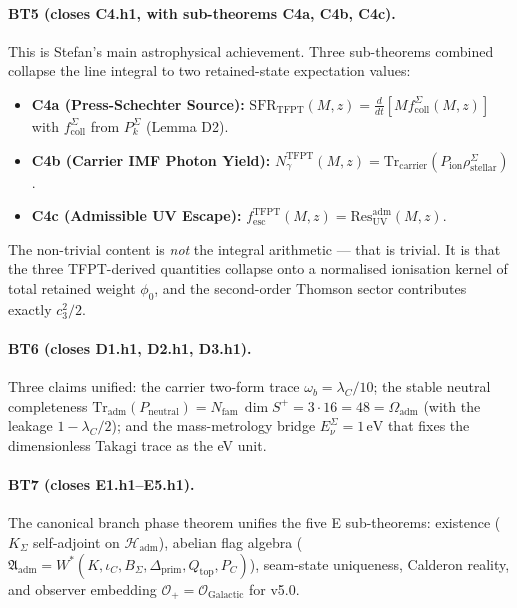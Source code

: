 \paragraph{BT5 (closes C4.h1, with sub-theorems C4a, C4b, C4c).}
This is Stefan's main astrophysical achievement.  Three sub-theorems
combined collapse the line integral to two retained-state expectation
values:
\begin{itemize}[leftmargin=1.4em]
\item \textbf{C4a (Press-Schechter Source):}
\(\mathrm{SFR}_{\mathrm{TFPT}}(M,z)=
\frac{d}{dt}[M f_{\mathrm{coll}}^\Sigma(M,z)]\) with
\(f_{\mathrm{coll}}^\Sigma\) from \(P_k^\Sigma\) (Lemma D2).
\item \textbf{C4b (Carrier IMF Photon Yield):}
\(N_\gamma^{\mathrm{TFPT}}(M,z)=
\mathrm{Tr}_{\mathrm{carrier}}(P_{\mathrm{ion}}\rho_{\mathrm{stellar}}^\Sigma)\).
\item \textbf{C4c (Admissible UV Escape):}
\(f_{\mathrm{esc}}^{\mathrm{TFPT}}(M,z)=
\mathrm{Res}_{\mathrm{UV}}^{\mathrm{adm}}(M,z)\).
\end{itemize}
The non-trivial content is \emph{not} the integral arithmetic --- that
is trivial.  It is that the three TFPT-derived quantities collapse
onto a normalised ionisation kernel of total retained weight
\(\phi_0\), and the second-order Thomson sector contributes exactly
\(c_3^2/2\).

\paragraph{BT6 (closes D1.h1, D2.h1, D3.h1).}  Three claims unified:
the carrier two-form trace \(\omega_b=\lambda_C/10\); the stable
neutral completeness
\(\mathrm{Tr}_{\mathrm{adm}}(P_{\mathrm{neutral}})=N_{\mathrm{fam}}\,\dim S^+
=3\cdot 16=48=\Omega_{\mathrm{adm}}\) (with the leakage
\(1-\lambda_C/2\)); and the mass-metrology bridge
\(E_\nu^\Sigma=1\,\mathrm{eV}\) that fixes the dimensionless Takagi
trace as the eV unit.

\paragraph{BT7 (closes E1.h1--E5.h1).}  The canonical branch phase
theorem unifies the five E sub-theorems: existence
(\(K_\Sigma\) self-adjoint on \(\mathcal H_{\mathrm{adm}}\)),
abelian flag algebra
(\(\mathfrak A_{\mathrm{adm}}=W^\ast(K,\iota_C,B_\Sigma,\Delta_{\mathrm{prim}},Q_{\mathrm{top}},P_C)\)),
seam-state uniqueness, Calderon reality, and observer embedding
\(\mathcal O_+=\mathcal O_{\mathrm{Galactic}}\) for v5.0.

